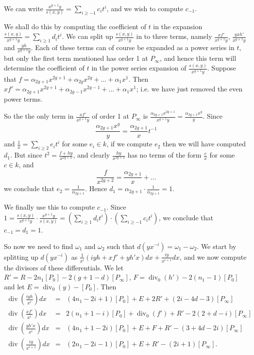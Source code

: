 \documentclass[draft, 11pt]{article} %
\theoremstyle{plain}
\theoremstyle{remark}
\DeclareMathOperator{\di}{div}
\begin{document}
We can write $\frac{x^{g+1}y}{s(x,y)} = \sum_{i\geq -1} c_i t^i$, and we wish to compute $c_{-1}$.

We shall do this by computing the coefficient of $t$ in the expansion $\frac{s(x,y)}{x^{g+1}y} = \sum_{i\geq 1}d_it^i$.
We can split up $\frac{s(x,y)}{x^{g+1}y}$ in to three terms, namely $\frac{xf'}{x^{g+1}y}$, $\frac{yxh'}{x^{g+1}y}$ and $\frac{yh}{x^{g+1}y}$.
Each of these terms can of course be expanded as a power series in $t$, but only the first term mentioned has order 1 at $P_\infty$, and hence this term will determine the coefficient of $t$ in the power series expansion of $\frac{s(x,y)}{x^{g+1}y}$.
Suppose that $f = \alpha_{2g+1}x^{2g+1} + \alpha_{2g}x^{2g} + \ldots + \alpha_1x^1$.
Then $xf'= \alpha_{2g+1}x^{2g+1} + \alpha_{2g-1}x^{2g-1} + \ldots + \alpha_1x^1$; i.e. we have just removed the even power terms.

So the the only term in $\frac{xf'}{x^{g+1}y}$ of order 1 at $P_\infty$ is $\frac{\alpha_{2g+1}x^{2g+1}}{x^{g+1}y} = \frac{\alpha_{2g+1}x^{g}}{y}$.
Since
\[
\frac{\alpha_{2g+1}x^g}{y} = \frac{\alpha_{2g+1}}{x}t^{-1}
\]
and $\frac{1}{x} = \sum_{i\geq 2}e_it^i$ for some $e_i \in k$, if we compute $e_2$ then we will have computed $d_1$.
But since $t^2 = \frac{f + hy}{x^{2g+2}}$, and clearly $\frac{hy}{x^{2g+2}}$ has no terms of the form $\frac{c}{x}$ for some $c \in k$, and 
\[
\frac{f}{x^{2g+2}} = \frac{\alpha_{2g+1}}{x} + \ldots
\]
we conclude that $e_2 = \frac{1}{\alpha_{2g+1}}$.
Hence $d_1 = \alpha_{2g+1} \cdot \frac{1}{\alpha_{2g+1}} = 1$.


We finally use this to compute $c_{-1}$.
Since $1 = \frac{s(x,y)}{x^{g+1}y}\cdot \frac{x^{g+1}y}{s(x,y)} = \left( \sum_{i\geq 1}d_it^i \right) \cdot \left( \sum_{i\geq -1}c_it^i\right)$, we conclude that $c_{-1} = d_{1} = 1$.


So now we need to find $\omega_1$ and $\omega_2$ such that $d(yx^{-i}) = \omega_1 - \omega_2$.
We start by splitting up $d(yx^{-i})$ as $\frac{1}{x^i} \left(iyh + xf' + yh'x \right) dx+ \frac{iy}{x^{i+1}} dx$, and we now compute the divisors of these differentials.
We let $R' = R - 2n_1[P_0] - 2(g+1-d)[P_\infty]$, $F = \di_0(h') - 2(n_1 - 1)[P_0]$ and let $E = \di_0(y) - [P_0]$.
Then
\begin{eqnarray*}
\di \left(\frac{iyh}{x^i}\right) dx  & = & (4n_1 -2i +1)[P_0] + E + 2R' + (2i-4d-3)[P_\infty] \\
\di \left(\frac{xf'}{x^i} \right) dx & = & 2(n_1 + 1 -i)[P_0] + \di_0(f') + R' -2(2+d-i)[P_\infty] \\
\di \left(\frac{yh'x}{x^i}\right) dx & = & (4n_1 + 1 -2i)[P_0] + E + F + R' - (3+4d-2i)[P_\infty] \\
\di \left( \frac{iy}{x^{i+1}}\right) dx & = & (2n_1 -2i -1)[P_0] + E + R'  -(2i+1)[P_\infty].
\end{eqnarray*}
\end{document}
